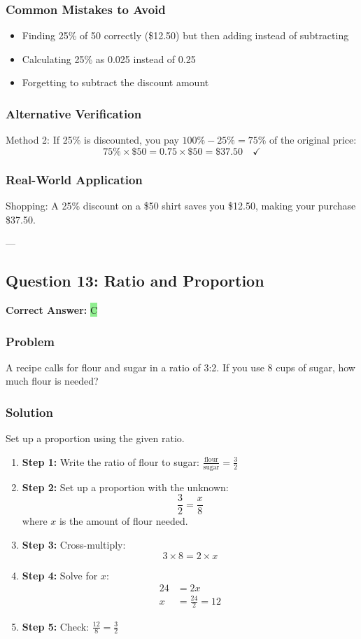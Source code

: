 \documentclass[12pt]{article}
\begin{document}
\subsubsection*{Common Mistakes to Avoid}
\begin{itemize}
\item Finding 25\% of 50 correctly (\$12.50) but then adding instead of subtracting
\item Calculating 25\% as 0.025 instead of 0.25
\item Forgetting to subtract the discount amount
\end{itemize}

\subsubsection*{Alternative Verification}
Method 2: If 25\% is discounted, you pay $100\% - 25\% = 75\%$ of the original price:
\[
75\% \times \$50 = 0.75 \times \$50 = \$37.50 \quad \checkmark
\]

\subsubsection*{Real-World Application}
Shopping: A 25\% discount on a \$50 shirt saves you \$12.50, making your purchase \$37.50.

---

\subsection{Question 13: Ratio and Proportion}

\textbf{Correct Answer: } \colorbox{lightgreen}{C}

\subsubsection*{Problem}
A recipe calls for flour and sugar in a ratio of 3:2. If you use 8 cups of sugar, how much flour is needed?

\subsubsection*{Solution}

Set up a proportion using the given ratio.

\begin{enumerate}
\item \textbf{Step 1:} Write the ratio of flour to sugar: $\frac{\text{flour}}{\text{sugar}} = \frac{3}{2}$
\item \textbf{Step 2:} Set up a proportion with the unknown:
  \[
  \frac{3}{2} = \frac{x}{8}
  \]
  where $x$ is the amount of flour needed.
\item \textbf{Step 3:} Cross-multiply:
  \[
  3 \times 8 = 2 \times x
  \]
\item \textbf{Step 4:} Solve for $x$:
  \begin{align*}
  24 &= 2x \\
  x &= \frac{24}{2} = 12
  \end{align*}
\item \textbf{Step 5:} Check: $\frac{12}{8} = \frac{3}{2}$ 
\end{enumerate}
\end{document}
